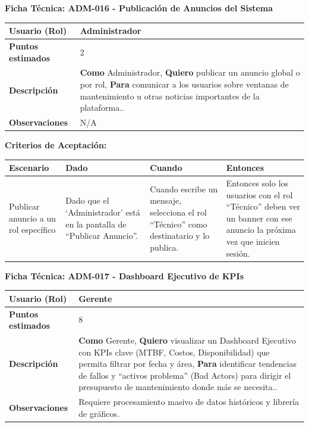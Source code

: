 \noindent
\textbf{Ficha Técnica: ADM-016 - Publicación de Anuncios del Sistema}
\footnotesize
\begin{longtable}{|p{}|p{}|}
\hline
\textbf{Usuario (Rol)} & Administrador \\ \hline
\textbf{Puntos estimados} & 2 \\ \hline
\textbf{Descripción} & \textbf{Como} Administrador, \textbf{Quiero} publicar un anuncio global o por rol, \textbf{Para} comunicar a los usuarios sobre ventanas de mantenimiento u otras noticias importantes de la plataforma.. \\ \hline
\textbf{Observaciones} & N/A \\ \hline
\end{longtable}
\normalsize

\noindent
\textbf{Criterios de Aceptación:}
\footnotesize
\begin{longtable}{|p{}|p{}|p{}|p{}|}
\hline
\textbf{Escenario} & \textbf{Dado} & \textbf{Cuando} & \textbf{Entonces} \\ \hline
\endhead
Publicar anuncio a un rol específico & Dado que el `Administrador' está en la pantalla de ``Publicar Anuncio''. & Cuando escribe un mensaje, selecciona el rol ``Técnico'' como destinatario y lo publica. & Entonces solo los usuarios con el rol ``Técnico'' deben ver un banner con ese anuncio la próxima vez que inicien sesión. \\ \hline
\end{longtable}
\normalsize

\noindent
\textbf{Ficha Técnica: ADM-017 - Dashboard Ejecutivo de KPIs}
\footnotesize
\begin{longtable}{|p{}|p{}|}
\hline
\textbf{Usuario (Rol)} & Gerente \\ \hline
\textbf{Puntos estimados} & 8 \\ \hline
\textbf{Descripción} & \textbf{Como} Gerente, \textbf{Quiero} visualizar un Dashboard Ejecutivo con KPIs clave (MTBF, Costos, Disponibilidad) que permita filtrar por fecha y área, \textbf{Para} identificar tendencias de fallos y ``activos problema'' (Bad Actors) para dirigir el presupuesto de mantenimiento donde más se necesita.. \\ \hline
\textbf{Observaciones} & Requiere procesamiento masivo de datos históricos y librería de gráficos. \\ \hline
\end{longtable}
\normalsize

